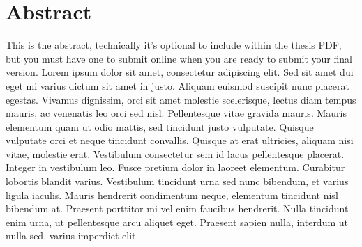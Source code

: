 \section*{Abstract}

\normalsize
This is the abstract, technically it's optional to include within the thesis PDF, but you must have one to submit online when you are ready to submit your final version.  Lorem ipsum dolor sit amet, consectetur adipiscing elit. Sed sit amet dui eget mi varius dictum sit amet in justo. Aliquam euismod suscipit nunc placerat egestas. Vivamus dignissim, orci sit amet molestie scelerisque, lectus diam tempus mauris, ac venenatis leo orci sed nisl. Pellentesque vitae gravida mauris. Mauris elementum quam ut odio mattis, sed tincidunt justo vulputate. Quisque vulputate orci et neque tincidunt convallis. Quisque at erat ultricies, aliquam nisi vitae, molestie erat. Vestibulum consectetur sem id lacus pellentesque placerat. Integer in vestibulum leo. Fusce pretium dolor in laoreet elementum. Curabitur lobortis blandit varius. Vestibulum tincidunt urna sed nunc bibendum, et varius ligula iaculis. Mauris hendrerit condimentum neque, elementum tincidunt nisl bibendum at. Praesent porttitor mi vel enim faucibus hendrerit. Nulla tincidunt enim urna, ut pellentesque arcu aliquet eget. Praesent sapien nulla, interdum ut nulla sed, varius imperdiet elit.



